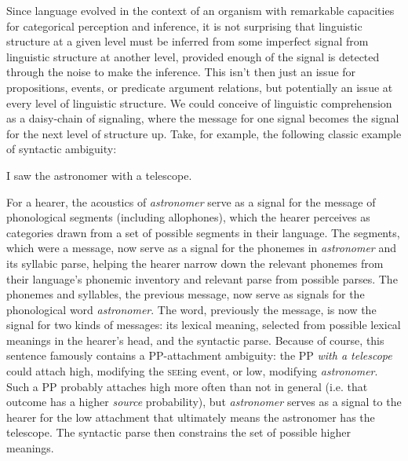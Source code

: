 \documentclass[12pt]{article}
\begin{document}
Since language evolved in the context of an organism with remarkable capacities for categorical perception and inference, it is not surprising that linguistic structure at a given level must be inferred from some imperfect signal from linguistic structure at another level, provided enough of the signal is detected through the noise to make the inference. This isn't then just an issue for propositions, events, or predicate argument relations, but potentially an issue at every level of linguistic structure. We could conceive of linguistic comprehension as a daisy-chain of signaling, where the message for one signal becomes the signal for the next level of structure up. Take, for example, the following classic example of syntactic ambiguity:

\begin{exe}
	\ex I saw the astronomer with a telescope.
\end{exe}

\noindent For a hearer, the acoustics of \textsl{astronomer} serve as a signal for the message of phonological segments (including allophones), which the hearer perceives as categories drawn from a set of possible segments in their language. The segments, which were a message, now serve as a signal for the phonemes in \textsl{astronomer} and its syllabic parse, helping the hearer narrow down the relevant phonemes from their language's phonemic inventory and relevant parse from possible parses. The phonemes and syllables, the previous message, now serve as signals for the phonological word \textsl{astronomer}. The word, previously the message, is now the signal for two kinds of messages: its lexical meaning, selected from possible lexical meanings in the hearer's head, and the syntactic parse. Because of course, this sentence famously contains a PP-attachment ambiguity: the PP \textsl{with a telescope} could attach high, modifying the \textsc{see}ing event, or low, modifying \textsl{astronomer}. Such a PP probably attaches high more often than not in general (i.e. that outcome has a higher \textsl{source} probability), but \textsl{astronomer} serves as a signal to the hearer for the low attachment that ultimately means the astronomer has the telescope. The syntactic parse then constrains the set of possible higher meanings.
\end{document}
